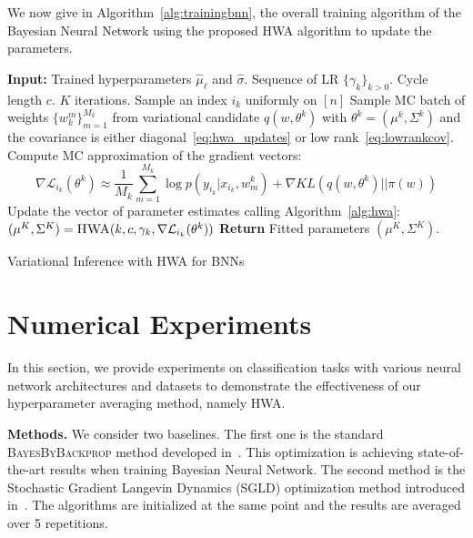 \documentclass{article} %
\begin{document}
We now give in Algorithm~\ref{alg:trainingbnn}, the overall training algorithm of the Bayesian Neural Network using the proposed HWA algorithm to update the parameters.
\begin{algorithm}[H]
\begin{algorithmic}[1]
\STATE \textbf{Input:} Trained hyperparameters $\hat{\mu}_{\ell}$ and $\hat{\sigma}$. Sequence of LR $\{\gamma_k\}_{k > 0}$. Cycle length $c$. $K$ iterations.
\STATE Sample an index $i_k$ uniformly on $[n]$
\STATE Sample MC batch of weights $\{w^m_k\}_{m=1}^{M_k}$  from variational candidate $q(w, \theta^k)$ with $\theta^k = (\mu^k, \Sigma^k)$ and the covariance is either diagonal~\eqref{eq:hwa_updates} or low rank~\eqref{eq:lowrankcov}.
\STATE Compute MC approximation of the gradient vectors:
$$ \nabla \mathcal{L}_{i_{k}}(\theta^{k}) \approx \frac{1}{M_k} \sum_{m=1}^{M_k} \log p(y_{i_k} | x_{i_k}, w^k_m)  + \nabla KL(q(w, \theta^k)||\pi(w)) $$
\STATE Update the vector of parameter estimates calling Algorithm~\ref{alg:hwa}: $(\mu^K, \Sigma^K) =  \textsc{HWA}(k, c, \gamma_k, \nabla \mathcal{L}_{i_{k}}(\theta^{k}) )$
\ENDFOR
\STATE \textbf{Return} Fitted parameters $(\mu^K, \Sigma^K)$.
\end{algorithmic}
\caption{Variational Inference with HWA for BNNs}
\label{alg:trainingbnn}
\end{algorithm}




\section{Numerical Experiments}\label{sec:numerical}
In this section, we provide experiments on classification tasks with various neural network architectures and datasets to demonstrate the effectiveness of our hyperparameter averaging method, namely HWA.

\textbf{Methods.}\hspace{0.1in}
We consider two baselines. 
The first one is the standard \textsc{BayesByBackprop} method developed in~\citep{blundell2015weight}. 
This optimization is achieving state-of-the-art results when training Bayesian Neural Network.
The second method is the Stochastic Gradient Langevin Dynamics (SGLD) optimization method introduced in~\citep{welling2011bayesian}.
The algorithms are initialized at the same point and the results are averaged over 5 repetitions.
\end{document}
